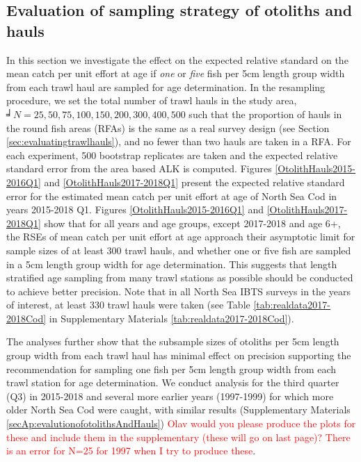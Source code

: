 \documentclass[a4paper 12pt]{article}
\numberwithin{equation}{section}
\newcommand{\ed}[1]{\textcolor{red}{#1}}
\begin{document}
\subsection{Evaluation of sampling strategy of otoliths and hauls}
\label{sec:optimumeffortresultsHaul}
In this section we investigate the effect on the expected relative standard on the mean catch per unit effort at age if \textit{one} or \textit{five} fish  per 5cm length group width from each trawl haul are sampled for age determination. In the resampling procedure, we set the total number of trawl hauls in the study area, $╛N = 25, 50, 75, 100, 150, 200, 300, 400, 500$ such that the proportion of hauls in the round fish areas (RFAs) is the same as a real survey design (see Section \ref{sec:evaluatingtrawlhauls}), and no fewer than two hauls are taken in a RFA.  For each experiment, 500 bootstrap replicates are taken and the expected relative standard error from the area based ALK is computed.  Figures \ref{OtolithHauls2015-2016Q1} and  \ref{OtolithHauls2017-2018Q1} present the expected relative standard error for the estimated mean catch per unit effort at age of North Sea Cod in years 2015-2018 Q1. Figures \ref{OtolithHauls2015-2016Q1} and \ref{OtolithHauls2017-2018Q1} show that for all years and age groups,  except 2017-2018 and age 6+, the RSEs of mean catch per unit effort at age approach their asymptotic limit for sample sizes of at least 300 trawl hauls, and whether one or five fish are sampled  in a 5cm length group width for age determination. This suggests that length stratified age sampling from many trawl stations as possible should be conducted to achieve better precision. Note that in all North Sea IBTS surveys in the years of interest, at least 330 trawl hauls were taken (see Table \ref{tab:realdata2017-2018Cod} in Supplementary Materials \ref{tab:realdata2017-2018Cod}). 

The analyses further show that the subsample sizes of otoliths per 5cm length group width from each trawl haul has minimal effect on precision supporting the recommendation for sampling one fish per 5cm length group width from each trawl station for age determination. We conduct analysis for the third quarter (Q3) in 2015-2018 and several more earlier years (1997-1999) for which more older North Sea Cod were caught, with similar results (Supplementary Materials \ref{secAp:evalutionofotolithsAndHauls}) \ed{Olav would you please produce the plots for these and include them in the supplementary (these will go on last page)? There is an error for N=25 for 1997 when I try to produce these}. 
\end{document}

